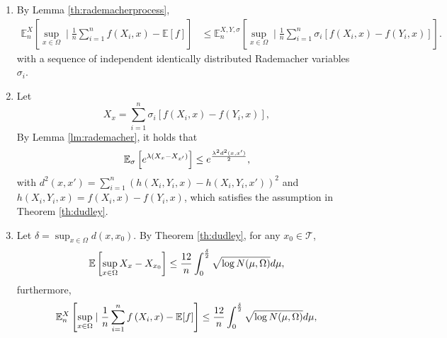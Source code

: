 \begin{enumerate}
\item By Lemma \ref{th:rademacherprocess}, 
\[
\begin{aligned}
\mathbb{E}_n^{X}\left[\sup _{x \in \Omega} \mid \frac{1}{n} \sum_{i=1}^{n} f\left(X_{i}, x\right)-\mathbb{E}[f]\right] 
& \leq \mathbb{E}_n^{X, Y, \sigma}\left[\sup _{x \in \Omega} \mid \frac{1}{n} \sum_{i=1}^{n} \sigma_{i}\left[f\left(X_{i}, x\right)-f\left(Y_{i}, x\right)\right]\right].
\end{aligned}
\]
with a sequence of independent identically distributed Rademacher variables $\sigma_{i}$.
\item Let $$
X_x = \sum_{i=1}^n \sigma_i\left[f\left(X_{i}, x\right)-f\left(Y_{i}, x\right)\right],
$$
By Lemma \ref{lm:rademacher}, it holds that
$$
\mathbb{E}_\sigma\left[ e^{\lambda (X_x - X_{x'})}\right]\le e^{\lambda^2 d^2(x, x')\over 2},
$$
with $\displaystyle d^2(x, x') = \sum_{i=1}^n(h(X_i, Y_i, x) - h(X_i, Y_i, x'))^2$ and $h(X_i, Y_i, x) = f\left(X_{i}, x\right)-f\left(Y_{i}, x\right)$, which satisfies the assumption in Theorem \ref{th:dudley}.
\item Let $\displaystyle \delta=\sup_{x\in \Omega} d(x, x_0)$. By Theorem \ref{th:dudley},  for any $x_0\in \mathcal{T}$,
\begin{equation} 
\mathbb{E}\left[\sup _{x \in \Omega} X_x-X_{x_0}\right] \leq {12\over n}\int_0^{\delta\over 2} \sqrt{\log N(\mu, \Omega)} d \mu,
\end{equation} 
 furthermore,
\begin{equation} 
\mathbb{E}_n^{X}\left[\sup _{x \in \Omega} \mid \frac{1}{n} \sum_{i=1}^{n} f\left(X_{i}, x\right)-\mathbb{E}[f]\right]  \leq {12\over n}\int_0^{\delta\over 2} \sqrt{\log N(\mu, \Omega)} d \mu,
\end{equation} 
\end{enumerate}

